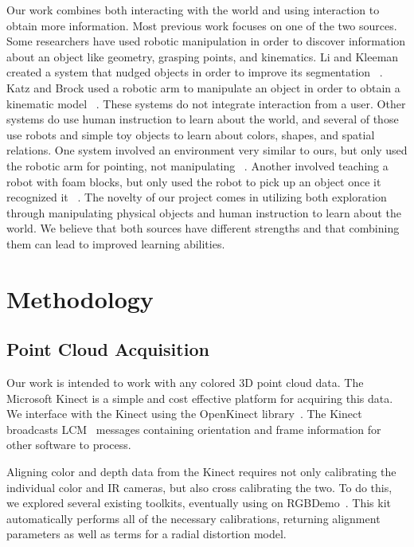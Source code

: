 \documentclass[11pt]{article}
\newcommand{\xxx}[1]{{\bf \color{red} #1}}
\begin{document}
Our work combines both interacting with the world and using interaction to obtain more information. Most previous work focuses on one of the two sources. Some researchers have used robotic manipulation in order to discover information about an object like geometry, grasping points, and kinematics. Li and Kleeman created a system that nudged objects in order to improve its segmentation ~\cite{li2008autonomous}. Katz and Brock used a robotic arm to manipulate an object in order to obtain a kinematic model ~\cite{katz2008manipulating}. These systems do not integrate interaction from a user. Other systems do use human instruction to learn about the world, and several of those use robots and simple toy objects to learn about colors, shapes, and spatial relations. One system involved an environment very similar to ours, but only used the robotic arm for pointing, not manipulating ~\cite{skocaj2007system}. Another involved teaching a robot with foam blocks, but only used the robot to pick up an object once it recognized it ~\cite{zambuto2010visually}. The novelty of our project comes in utilizing both exploration through manipulating physical objects and human instruction to learn about the world. We believe that both sources have different strengths and that combining them can lead to improved learning abilities.

\section{Methodology}

\subsection{Point Cloud Acquisition}
Our work is intended to work with any colored 3D point cloud data. The
Microsoft Kinect is a simple and cost effective platform for acquiring
this data. We interface with the Kinect using the OpenKinect
library~\cite{OpenKinect}. The Kinect broadcasts LCM~\cite{huang2010} messages
containing orientation and frame information for other software to process.

Aligning color and depth data from the Kinect requires not only
calibrating the individual color and IR cameras, but also cross calibrating
the two. To do this, we explored several existing toolkits, eventually
using on RGBDemo~\cite{rgbdemo}. This kit automatically performs all of the
necessary calibrations, returning alignment parameters as well as terms for a
radial distortion model.
\end{document}

